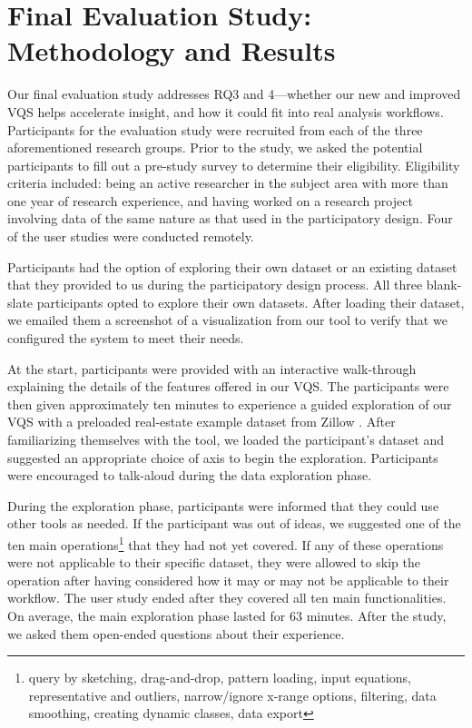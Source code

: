 \section{Final Evaluation Study: Methodology and Results} \label{evaluation}
\par Our final evaluation study addresses RQ3 and 4---whether our new and improved VQS helps accelerate insight, and how it could fit into real analysis workflows. Participants for the evaluation study were recruited from each of the three aforementioned research groups. Prior to the study, we asked the potential participants to fill out a pre-study survey to determine their eligibility. Eligibility criteria included: being an active researcher in the subject area with more than one year of research experience, and having worked on a research project involving data of the same nature as that used in the participatory design. Four of the user studies were conducted remotely.  
\par Participants had the option of exploring their own dataset or an existing dataset that they provided to us during the participatory design process. All three blank-slate participants opted to explore their own datasets. After loading their dataset, we emailed them a screenshot of a visualization from our tool to verify that we configured the system to meet their needs. 
\par At the start, participants were provided with an interactive walk-through explaining the details of the features offered in our VQS. The participants were then given approximately ten minutes to experience a guided exploration of our VQS with a preloaded real-estate example dataset from Zillow \cite{zillow}.  After familiarizing themselves with the tool, we loaded the participant's dataset and suggested an appropriate choice of axis to begin the exploration. Participants were encouraged to talk-aloud during the data exploration phase.
\par During the exploration phase, participants were informed that they could use other tools as needed. If the participant was out of ideas, we suggested one of the ten main operations\footnote{query by sketching, drag-and-drop, pattern loading, input equations, representative and outliers, narrow/ignore x-range options, filtering, data smoothing, creating dynamic classes,  data export} that they had not yet covered. If any of these operations were not applicable to their specific dataset, they were allowed to skip the operation after having considered how it may or may not be applicable to their workflow. The user study ended after they covered all ten main functionalities. On average, the main exploration phase lasted for 63 minutes. After the study, we asked them open-ended questions about their experience. 
